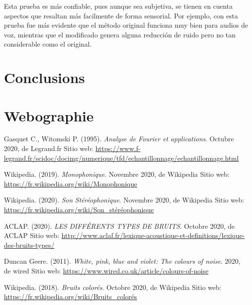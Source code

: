 \documentclass[conference,onecolumn]{IEEEtran}
\begin{document}
Esta prueba es más confiable, pues aunque sea subjetiva, se tienen en cuenta aspectos que resaltan más facilmente de forma sensorial. Por ejemplo, con esta prueba fue más evidente que el método original funciona muy bien para audios de voz, mientras que el modificado genera alguna reducción de ruido pero no tan considerable como el original.

\newpage
\section{Conclusions}
\newpage
\section{Webographie}
\renewcommand\refname{}
\begin{flushleft}
\begin{thebibliography}{100}

Gasquet C., Witomski P. (1995).
\textit{Analyse de Fourier et applications}. Octubre 2020, de Legrand.fr Sitio web: \href{https://www.f-legrand.fr/scidoc/docimg/numerique/tfd/echantillonnage/echantillonnage.html}{https://www.f-legrand.fr/scidoc/docimg/numerique/tfd/echantillonnage/echantillonnage.html}

Wikipedia. (2019).
\textit{Monophonique}. Novembre 2020, de Wikipedia Sitio web: \href{https://fr.wikipedia.org/wiki/Monophonique}{https://fr.wikipedia.org/wiki/Monophonique}

Wikipedia. (2020).
\textit{Son Stéréophonique}. Novembre 2020, de Wikipedia Sitio web: \href{https://fr.wikipedia.org/wiki/Son_stéréophonique}{https://fr.wikipedia.org/wiki/Son\_stéréophonique}

ACLAP. (2020). 
\textit{LES DIFFÉRENTS TYPES DE BRUITS}. Octobre 2020, de ACLAP Sitio web: \href{http://www.aclaf.fr/lexique-acoustique-et-definitions/lexique-des-bruits-types/}{http://www.aclaf.fr/lexique-acoustique-et-definitions/lexique-des-bruits-types/}

Duncan Geere. (2011).
\textit{White, pink, blue and violet: The colours of noise}. 2020, de wired Sitio web: \href{https://www.wired.co.uk/article/colours-of-noise}{https://www.wired.co.uk/article/colours-of-noise}

Wikipedia. (2018).
\textit{Bruits colorés}. Octobre 2020, de Wikipedia Sitio web: \href{https://fr.wikipedia.org/wiki/Bruits\_colorés}{https://fr.wikipedia.org/wiki/Bruits\_colorés}


\end{thebibliography}
\end{flushleft}
\end{document}
